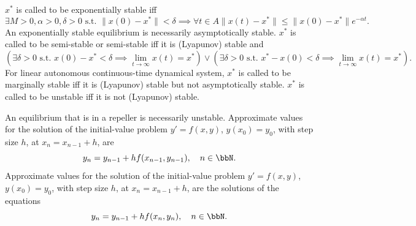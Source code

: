 \documentclass[a4paper,12pt]{report}
\begin{document}
$x^*$ is called to be exponentially stable iff
\[\exists M>0,\alpha>0,\delta>0\text{\ s.t.\ }\|x(0)-x^*\|<\delta\implies\forall t\in A\|x(t)-x^*\|\leq\|x(0)-x^*\|e^{-\alpha t}.\]
An exponentially stable equilibrium is necessarily asymptotically stable.
$x^*$ is called to be semi-stable or semi-stable iff it is (Lyapunov) stable and
\[(\exists\delta>0\text{\ s.t.\ }x(0)-x^*<\delta\implies\lim_{t\to\infty}x(t)=x^*)\lor (\exists\delta>0\text{\ s.t.\ }x^*-x(0)<\delta\implies\lim_{t\to\infty}x(t)=x^*).\]
For linear autonomous continuous-time dynamical system, $x^*$ is called to be marginally stable iff it is (Lyapunov) stable but not asymptotically stable.
$x^*$ is called to be unstable iff it is not (Lyapunov) stable.

An equilibrium that is in a repeller is necessarily unstable.
Approximate values for the solution of the initial-value problem $y'=f(x,y)$, $y(x_0)=y_0$, with step size $h$, at $x_n=x_{n-1}+h$, are
\[y_n=y_{n-1}+hf(x_{n-1},y_{n-1}),\quad n\in\bbN.\]
Approximate values for the solution of the initial-value problem $y'=f(x,y)$, $y(x_0)=y_0$, with step size $h$, at $x_n=x_{n-1}+h$, are the solutions of the equations
\[y_n=y_{n-1}+hf(x_n,y_n),\quad n\in\bbN.\]
\end{document}

